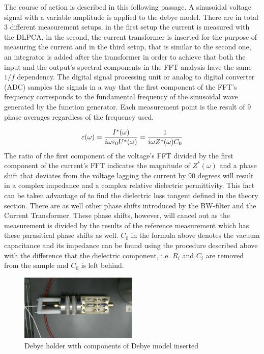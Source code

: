 The course of action is described in this following passage.
\newline
A sinusoidal voltage signal with a variable amplitude is applied to the debye model. There are in total 3 different measurement setups,
in the first setup the current is measured with the DLPCA, in the second, the current transformer is inserted for the purpose of measuring 
the current and in the third setup, that is similar to the second one, an integrator is added after the transformer in order
to achieve that both the input and the output's spectral components in the FFT analysis have the same $1/f$ dependency.
The digital signal processing unit or analog to digital converter (ADC) samples the signals in a way that 
the first component of the FFT's frequency corresponds to the fundamental frequency
of the sinusoidal wave generated by the function generator. Each measurement point is the result of 9 phase averages regardless of the frequency used.



\begin{equation}
\varepsilon(\omega)=\frac{I^*(\omega)}{i \omega \varepsilon_0 U^*(\omega)} = \frac{1}{i \omega Z^*(\omega) C_0}\\
\end{equation}
The ratio of the first component of the voltage's FFT divided by the first component of the current's FFT indicates the magnitude
of $Z^*(\omega)$ and a phase shift that deviates from the voltage lagging the current by 90 degrees will result in a complex impedance and a complex relative dielectric permittivity. This fact can be taken advantage of to find the dielectric loss tangent defined in the theory section. There are as well other phase shifts introduced by the BW-filter and the Current Transformer. These phase shifts, however, will cancel out as the measurement is divided by the results of the reference measurement which has these parasitical phase shifts as well. 
\newline
$C_0$ in the formula above denotes the vacuum capacitance and its impedance can be found using the procedure described above with the difference that
the dielectric component, i.e. $R_i$ and $C_i$ are removed from the sample and $C_0$ is left behind.

\begin{figure}[h!tb]
 \centering

 \includegraphics[width=0.5\textwidth]{figures/Method/Experimentaufbau/debyesample}
 \caption[Kurze Abbildungsbeschreibung]{Debye holder with components of Debye model inserted}

 
 
 \end{figure}


